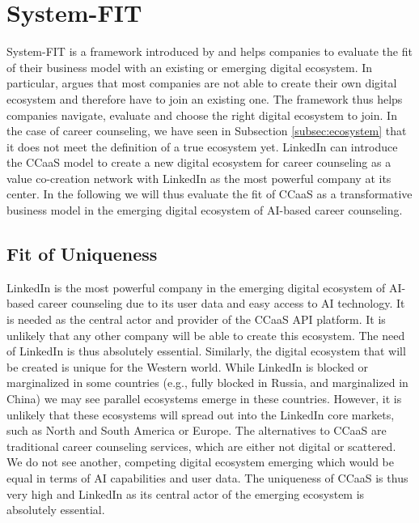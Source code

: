 \section{System-FIT}
\label{sec:system_fit}

System-FIT is a framework introduced by \citet{schwafertsDigitalBusinessDevelopment2020} and helps
companies to evaluate the fit of their business model with an existing or emerging digital ecosystem.
In particular, \cite{schwafertsDigitalBusinessDevelopment2020} argues that most companies are not able
to create their own digital ecosystem and therefore have to join an existing one. The framework
thus helps companies navigate, evaluate and choose the right digital ecosystem to join. 
In the case of career counseling, we have seen in Subsection \ref{subsec:ecosystem} that it
does not meet the definition of a true ecosystem yet. LinkedIn can introduce the CCaaS model to 
create a new digital ecosystem for career counseling as a value co-creation network with LinkedIn
as the most powerful company at its center. In the following we will thus evaluate the fit of CCaaS
as a transformative business model in the emerging digital ecosystem of AI-based career counseling.


\subsection{Fit of Uniqueness}

LinkedIn is the most powerful company in the emerging digital ecosystem of AI-based career counseling
due to its user data and easy access to AI technology. It is needed as the central actor and provider
of the CCaaS API platform. It is unlikely that any other company will be able to create this ecosystem.
The need of LinkedIn is thus absolutely essential.
Similarly, the digital ecosystem that will be created is unique for the Western world. While LinkedIn
is blocked or marginalized in some countries (e.g., fully blocked in Russia, and marginalized in China)
we may see parallel ecosystems emerge in these countries. However, it is unlikely that these ecosystems
will spread out into the LinkedIn core markets, such as North and South America or Europe.
The alternatives to CCaaS are traditional career counseling services, which are either not digital
or scattered. We do not see another, competing digital ecosystem emerging which would be equal in
terms of AI capabilities and user data. The uniqueness of CCaaS is thus very high and LinkedIn as its
central actor of the emerging ecosystem is absolutely essential.


